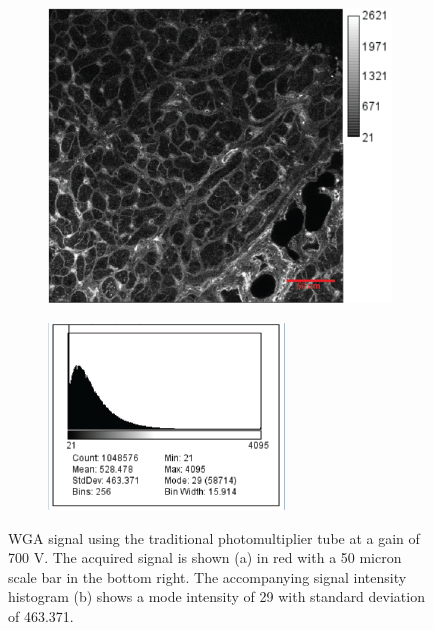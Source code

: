 \documentclass[12pt]{article}
\begin{document}
\begin{figure}[H]
	\begin{subfigure}{.5\textwidth}
		\centering
		\includegraphics[width=.95\linewidth]{FinalFigures/WGA_PMT_high.png}
		\caption{}
		\label{fig:wga_pmt_h}
	\end{subfigure}%
	\begin{subfigure}{.5\textwidth}
		\centering
		\includegraphics[width=.95\linewidth]{FinalFigures/WGA_PMT_High_Hist.png}
		\caption{}
		\label{fig:wga_pmt_h_hist}
	\end{subfigure}
	\caption{WGA signal using the traditional photomultiplier tube at a gain of 700 V. The acquired signal is shown (a) in red with a 50 micron scale bar in the bottom right. The accompanying signal intensity histogram (b) shows a mode intensity of 29 with standard deviation of 463.371.}
	\label{fig:wga_pmt_high}
\end{figure}
\end{document}
